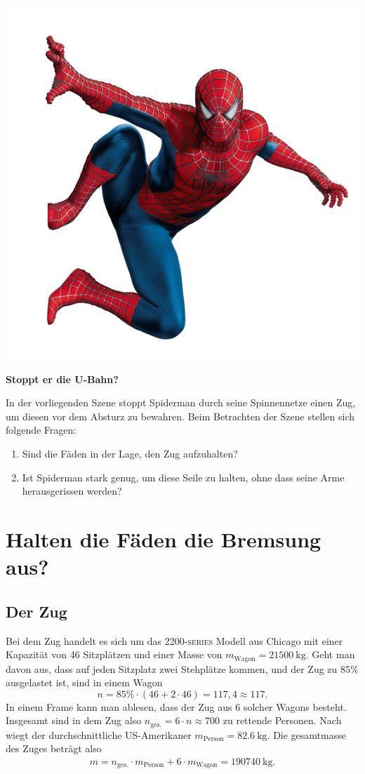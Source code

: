 \documentclass[a4paper, 11pt, nofonts, 
twoside, sfsidenotes, nobib, justified]{tufte-handout}
\begin{document}
\begin{marginfigure}
	\centering
	\includegraphics[width = \linewidth]{material/08 deko2.png}
\end{marginfigure}
{\bfseries{\LARGE Stoppt er die U-Bahn?} }
\vspace{1em}

In der vorliegenden Szene stoppt Spiderman durch seine Spinnennetze einen Zug, um diesen vor dem Absturz zu bewahren. Beim Betrachten der Szene stellen sich folgende Fragen:
\begin{enumerate}
	\item Sind die Fäden in der Lage, den Zug aufzuhalten?
	\item Ist Spiderman stark genug, um diese Seile zu halten, ohne dass seine Arme herausgerissen werden?
\end{enumerate}
\section{Halten die Fäden die Bremsung aus?} 
\subsection{Der Zug}
Bei dem Zug handelt es sich um das \textsc{2200-series} Modell aus Chicago mit einer Kapazität von 46 Sitzplätzen und einer Masse von $m_\text{Wagon}=\SI{21500}{\kilogram}$. \cite{WSem03} Geht man davon aus, dass auf jeden Sitzplatz zwei Stehplätze kommen, und der Zug zu 85\% ausgelastet ist, sind in einem Wagon 
$$n = 85\%\cdot \left( 46 + 2\cdot 46 \right)=117,4\approx 117.$$ In einem Frame kann man ablesen, dass der Zug aus 6 solcher Wagons besteht. Insgesamt sind in dem Zug also $n_\text{ges.} = 6\cdot n \approx 700$ zu rettende Personen. Nach \cite{WSem04} wiegt der durchschnittliche US-Amerikaner $m_\text{Person}=\SI{82.6}{\kilogram}$. Die gesamtmasse des Zuges beträgt also
\begin{align*}
	m = n_\text{ges.} \cdot m_\text{Person} + 6\cdot m_\text{Wagon}=\SI{190740}{\kilogram}.
\end{align*}
\end{document}
